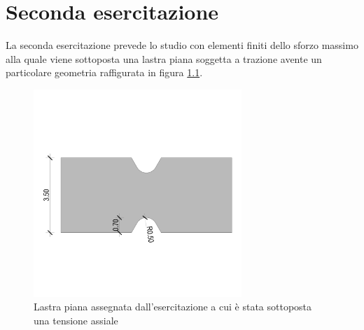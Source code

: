 \chapter{Seconda esercitazione}
La seconda esercitazione prevede lo studio con elementi finiti dello sforzo massimo alla quale viene sottoposta una lastra piana soggetta a trazione avente un particolare geometria raffigurata in figura \ref{fig:lastraIniziale}.
\begin{figure}[htb]
    \centering
    \includegraphics[width=0.7\textwidth]{rel2/img2/2Lastra.pdf}
    \caption{Lastra piana assegnata dall'esercitazione a cui è stata sottoposta una tensione assiale}
    \label{fig:lastraIniziale}
\end{figure}

